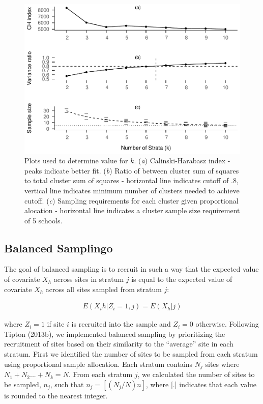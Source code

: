 \documentclass[man,floatsintext]{apa6}
\begin{document}
\begin{figure}
\centering
\includegraphics{GenSamp-Paper_files/figure-latex/fig-k-plots-1.pdf}
\caption{\label{fig:fig-k-plots}Plots used to determine value for \(k\). (\emph{a}) Calinski-Harabasz index - peaks indicate better fit. (\emph{b}) Ratio of between cluster sum of squares to total cluster sum of squares - horizontal line indicates cutoff of .8, vertical line indicates minimum number of clusters needed to achieve cutoff. (\emph{c}) Sampling requirements for each cluster given proportional alocation - horizontal line indicates a cluster sample size requirement of 5 schools.}
\end{figure}

\hypertarget{balanced-samplingo}{%
\subsection{Balanced Samplingo}\label{balanced-samplingo}}

The goal of balanced sampling is to recruit in such a way that the expected value of covariate \(X_h\) across sites in stratum \(j\) is equal to the expected value of covariate \(X_h\) across all sites sampled from stratum \(j\):

\begin{align}
  E(X_ih|Z_i = 1, j) = E(X_h|j)
\end{align}

where \(Z_i = 1\) if site \(i\) is recruited into the sample and \(Z_i = 0\) otherwise. Following Tipton (2013b), we implemented balanced sampling by prioritizing the recruitment of sites based on their similarity to the \enquote{average} site in each stratum. First we identified the number of sites to be sampled from each stratum using proportional sample allocation. Each stratum contains \(N_j\) sites where \(N_1 + N_2 ... + N_k = N\). From each stratum \(j\), we calculated the number of sites to be sampled, \(n_j\), such that \(n_j = [(N_j/N)n]\), where {[}.{]} indicates that each value is rounded to the nearest integer.
\end{document}

